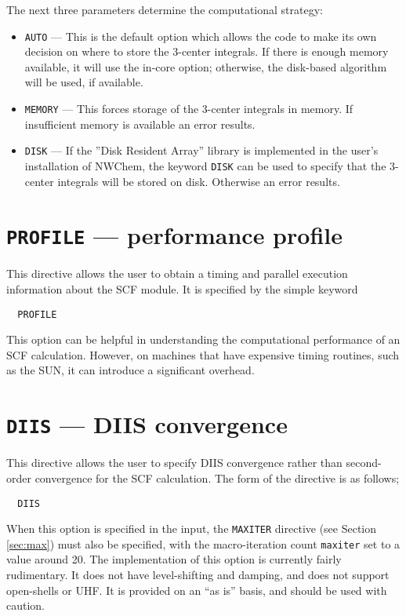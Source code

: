 The next three parameters determine the computational strategy:
\begin{itemize}
\item \verb+AUTO+ --- This is the default option which allows the code
  to make its own decision on where to store the 3-center integrals.
  If there is enough memory available, it will use the in-core option;
  otherwise, the disk-based algorithm will be used, if available.

\item \verb+MEMORY+ --- This forces storage of the 3-center integrals
  in memory.  If insufficient memory is available an error results.

\item \verb+DISK+ --- If the ''Disk Resident Array'' library is
  implemented in the user's installation of NWChem, the keyword
  \verb+DISK+ can be used to specify that the 3-center integrals will
  be stored on disk.  Otherwise an error results.
\end{itemize}

\section{{\tt PROFILE} --- performance profile}

This directive allows the user to obtain a timing and parallel
execution information about the SCF module.  It is specified by the
simple keyword

\begin{verbatim}
  PROFILE
\end{verbatim}

This option can be helpful in understanding the computational
performance of an SCF calculation.  However, on machines that have
expensive timing routines, such as the SUN, it can introduce a
significant overhead.

\section{{\tt DIIS} --- DIIS convergence}

This directive allows the user to specify DIIS convergence rather than
second-order convergence for the SCF calculation.  The form of the
directive is as follows;

\begin{verbatim}
  DIIS
\end{verbatim}

When this option is specified in the input, the \verb+MAXITER+
directive (see Section \ref{sec:max}) must also be specified, with the
macro-iteration count \verb+maxiter+ set to a value around 20.  The
implementation of this option is currently fairly rudimentary.  It
does not have level-shifting and damping, and does not support
open-shells or UHF.  It is provided on an ``as is'' basis, and should
be used with caution.

